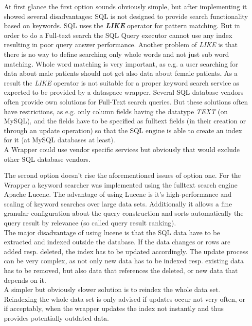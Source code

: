 At first glance the first option sounds obviously simple, but after implementing it showed several disadvantages: SQL is not designed to provide search functionality based on keywords. SQL uses the \textbf{\emph{LIKE}} operator for pattern matching. But in order to do a Full-text search the SQL Query executor cannot use any index resulting in poor query answer performance. Another problem of \emph{LIKE} is that there is no way to define searching only whole words and not just sub word matching. Whole word matching is very important, as e.g. a user searching for data about male patients should not get also data about female patients.
As a result the \emph{LIKE} operator is not suitable for a proper keyword search service as expected to be provided by a dataspace wrapper. Several SQL database vendors often provide own solutions for Full-Text search queries. But these solutions often have restrictions, as e.g. only column fields having the datatype \emph{TEXT} (on MySQL), and the fields have to be specified as fulltext fields (in their creation or through an update operation) so that the SQL engine is able to create an index for it (at MySQL databases at least).\\
A Wrapper could use vendor specific services but obviously that would exclude other SQL database vendors.

The second option doesn't rise the aforementioned issues of option one. For the Wrapper a keyword searcher was implemented using the fulltext search engine Apache Lucene. The advantage of using Lucene is it's high-performance and scaling of keyword searches over large data sets. Additionally it allows a fine granular configuration about the query construction and sorts automatically the query result by relevance (so called query result ranking). \\
The major disadvantage of using lucene is that the SQL data have to be extracted and indexed outside the database. If the data changes or rows are added resp. deleted, the index has to be updated accordingly. The update process can be very complex, as not only new data has to be indexed resp. existing data has to be removed, but also data that references the deleted, or new data that depends on it.\\
A simpler but obviously slower solution is to reindex the whole data set. Reindexing the whole data set is only advised if updates occur not very often, or if acceptably, when the wrapper updates the index not instantly and thus provides potentially outdated data.

